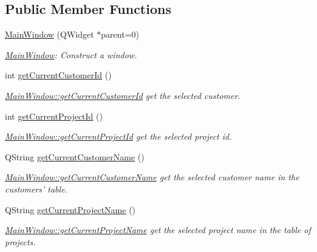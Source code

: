 \subsection*{Public Member Functions}
\begin{DoxyCompactItemize}
\item 
\hyperlink{classGui_1_1MainWindow_a5ea8e526d288b96595618942d44154d3}{Main\+Window} (Q\+Widget $\ast$parent=0)
\begin{DoxyCompactList}\small\item\em \hyperlink{classGui_1_1MainWindow}{Main\+Window}\+: Construct a window. \end{DoxyCompactList}\item 
int \hyperlink{classGui_1_1MainWindow_a202cb1e7a7c0e47af15306c2587693ec}{get\+Current\+Customer\+Id} ()
\begin{DoxyCompactList}\small\item\em \hyperlink{classGui_1_1MainWindow_a202cb1e7a7c0e47af15306c2587693ec}{Main\+Window\+::get\+Current\+Customer\+Id} get the selected customer. \end{DoxyCompactList}\item 
int \hyperlink{classGui_1_1MainWindow_a9580e96fd90710c5e2c299c68108409a}{get\+Current\+Project\+Id} ()
\begin{DoxyCompactList}\small\item\em \hyperlink{classGui_1_1MainWindow_a9580e96fd90710c5e2c299c68108409a}{Main\+Window\+::get\+Current\+Project\+Id} get the selected project id. \end{DoxyCompactList}\item 
Q\+String \hyperlink{classGui_1_1MainWindow_a0303a1752424b1e8c1a6e1b0bba2a823}{get\+Current\+Customer\+Name} ()
\begin{DoxyCompactList}\small\item\em \hyperlink{classGui_1_1MainWindow_a0303a1752424b1e8c1a6e1b0bba2a823}{Main\+Window\+::get\+Current\+Customer\+Name} get the selected customer name in the customers' table. \end{DoxyCompactList}\item 
Q\+String \hyperlink{classGui_1_1MainWindow_af83b009038b41bc676d15cb9bcfd5a39}{get\+Current\+Project\+Name} ()
\begin{DoxyCompactList}\small\item\em \hyperlink{classGui_1_1MainWindow_af83b009038b41bc676d15cb9bcfd5a39}{Main\+Window\+::get\+Current\+Project\+Name} get the selected project name in the table of projects. \end{DoxyCompactList}\item 

\end{DoxyCompactItemize}

